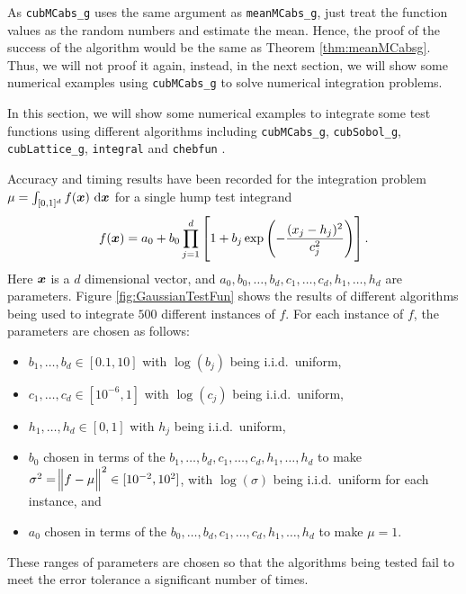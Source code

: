 \documentclass{iitthesis}
\begin{document}
As {\tt cubMCabs\_g} uses the same argument as {\tt meanMCabs\_g}, just treat the function values as the random numbers and estimate the mean. Hence, the proof of the success of the algorithm would be the same as Theorem \ref{thm:meanMCabsg}. Thus, we will not proof it again,  instead, in the next section, we will show some numerical examples using {\tt cubMCabs\_g} to solve numerical integration problems.

In this section, we will show some numerical examples to integrate some test functions using different algorithms including {\tt cubMCabs\_g}, {\tt cubSobol\_g}\cite{HicJim16a}, {\tt cubLattice\_g}\cite{JimHic16a}, {\tt integral}\cite{Shampone08} and {\tt chebfun} \cite{Chebfun14}.

\label{subsec:meanmcabssinglehump}
Accuracy and timing results have been recorded for the integration problem $\mu=\int_{[0,1]^d} f(\vx) \, \dif \vx$ for a single hump test integrand
\begin{equation} \label{GaussianTestFun}
f(\boldsymbol{x})=a_0 + b_0\prod_{j=1}^d\left[ 1 +b_j \exp \left(-\frac{(x_j-h_j)^2}{c_j^2}\right) \right].
\end{equation}
Here $\boldsymbol{x}$ is a $d$ dimensional vector, and $a_0, b_0, \ldots, b_d, c_1, \ldots, c_d, h_1, \ldots, h_d$ are parameters. Figure \ref{fig:GaussianTestFun} shows the results of different algorithms being used to integrate $500$ different instances of $f$.  For each instance of $f$, the parameters are chosen as follows:
\begin{itemize} 
\item $b_1, \ldots, b_d \in [0.1,10]$ with $\log(b_j)$ being i.i.d.\ uniform,
\item $c_1, \ldots, c_d \in [10^{-6},1]$ with $\log(c_j)$ being i.i.d.\ uniform,
\item $h_1, \ldots, h_d \in [0,1]$ with $h_j$ being i.i.d.\ uniform,
\item $b_0$ chosen in terms of the $b_1, \ldots, b_d, c_1, \ldots, c_d, h_1, \ldots, h_d$ to make $\sigma^2 =\norm[2]{f-\mu}^2 \in [10^{-2}, 10^2]$, with $\log(\sigma)$ being i.i.d.\ uniform for each instance, and
\item $a_0$ chosen in terms of the $b_0, \ldots, b_d, c_1, \ldots, c_d, h_1, \ldots, h_d$ to make $\mu=1$.
\end{itemize}
These ranges of parameters are chosen so that the algorithms being tested fail to meet the error tolerance a significant number of times.
\end{document}
